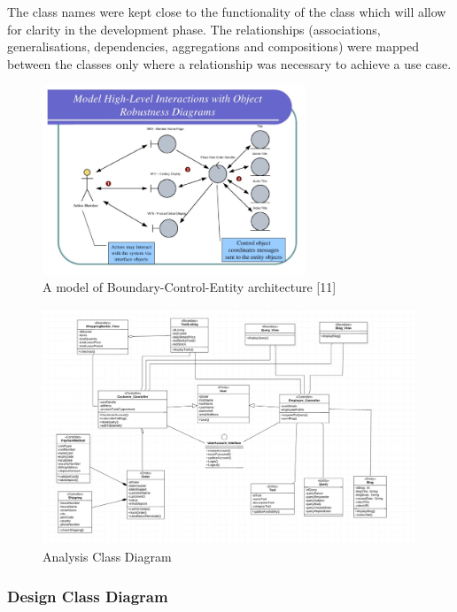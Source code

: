 \documentclass[fontsize=11pt]{extarticle}
\numberwithin{figure}{section} %
\numberwithin{table}{section}%
\begin{document}
The class names were kept close to the functionality of the class which
will allow for clarity in the development phase. The relationships
(associations, generalisations, dependencies, aggregations and
compositions) were mapped between the classes only where a relationship
was necessary to achieve a use case.

\begin{figure}[H]
      \centering
      \includegraphics[trim = 0 0 0 0, clip, width=0.7\textwidth]{TempImg/OOClass.png}
      \caption{A model of Boundary-Control-Entity architecture [11]}
 \end{figure}

\begin{figure}[H]
      \centering
      \includegraphics[trim = 0 0 0 0, clip, width=0.99\textwidth]{TempImg/AClass.png}
      \caption{Analysis Class Diagram}
 \end{figure}

\hypertarget{design-class-diagram}{%
\subsubsection{Design Class Diagram}\label{design-class-diagram}}
\end{document}
